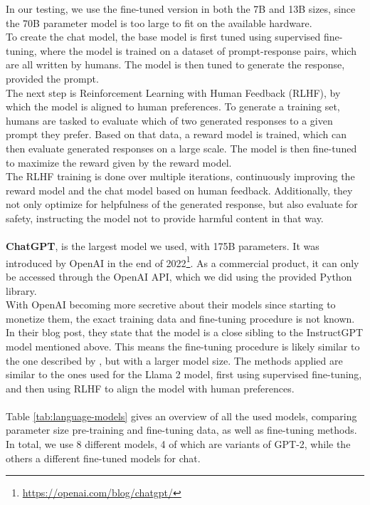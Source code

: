 In our testing, we use the fine-tuned version in both the 7B and 13B sizes, since the 70B parameter model is too large to fit on the available hardware.
\\
To create the chat model, the base model is first tuned using supervised fine-tuning, where the model is trained on a dataset of prompt-response pairs, which are all written by humans.
The model is then tuned to generate the response, provided the prompt.
\\
The next step is Reinforcement Learning with Human Feedback (RLHF), by which the model is aligned to human preferences. 
To generate a training set, humans are tasked to evaluate which of two generated responses to a given prompt they prefer.
Based on that data, a reward model is trained, which can then evaluate generated responses on a large scale.
The model is then fine-tuned to maximize the reward given by the reward model.
\\
The RLHF training is done over multiple iterations, continuously improving the reward model and the chat model based on human feedback.
Additionally, they not only optimize for helpfulness of the generated response, but also evaluate for safety, instructing the model not to provide harmful content in that way.
\\
\\
\textbf{ChatGPT}, is the largest model we used, with 175B parameters. 
It was introduced by OpenAI in the end of 2022\footnote{\url{https://openai.com/blog/chatgpt/}}.
As a commercial product, it can only be accessed through the OpenAI API, which we did using the provided Python library.
\\
With OpenAI becoming more secretive about their models since starting to monetize them, the exact training data and fine-tuning procedure is not known.
In their blog post, they state that the model is a close sibling to the InstructGPT model mentioned above.
This means the fine-tuning procedure is likely similar to the one described by \cite{ouyang:2022:Training}, but with a larger model size.
The methods applied are similar to the ones used for the Llama 2 model, first using supervised fine-tuning, and then using RLHF to align the model with human preferences.
\\
\\
Table \ref{tab:language-models} gives an overview of all the used models, comparing parameter size pre-training and fine-tuning data, as well as fine-tuning methods.
In total, we use 8 different models, 4 of which are variants of GPT-2, while the others a different fine-tuned models for chat.
